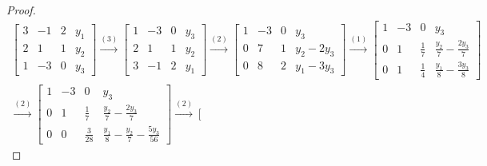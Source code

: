 \begin{proof}
    \begingroup{}
    \allowdisplaybreaks{}
    \begin{align*}
        \left[\begin{array}{ccc|c}
                      3 & -1 & 2 & y_{1} \\
                      2 & 1  & 1 & y_{2} \\
                      1 & -3 & 0 & y_{3}
                  \end{array}\right]
        \stackrel{(3)}{\rightarrow}
        \left[\begin{array}{ccc|c}
                      1 & -3 & 0 & y_{3} \\
                      2 & 1  & 1 & y_{2} \\
                      3 & -1 & 2 & y_{1}
                  \end{array}\right]
        \stackrel{(2)}{\rightarrow}
        \left[\begin{array}{ccc|c}
                      1 & -3 & 0 & y_{3}            \\
                      0 & 7  & 1 & y_{2} - 2{y_{3}} \\
                      0 & 8  & 2 & y_{1} - 3{y_{3}}
                  \end{array}\right]
        \stackrel{(1)}{\rightarrow}
        \left[\begin{array}{ccc|c}
                      1 & -3 & 0           & y_{3}                                \\
                      0 & 1  & \frac{1}{7} & \frac{y_{2}}{7} - \frac{2{y_{3}}}{7} \\
                      0 & 1  & \frac{1}{4} & \frac{y_{1}}{8} - \frac{3{y_{3}}}{8}
                  \end{array}\right]                                                     \\
        \stackrel{(2)}{\rightarrow}
        \left[\begin{array}{ccc|c}
                      1 & -3 & 0            & y_{3}                                                   \\
                      0 & 1  & \frac{1}{7}  & \frac{y_{2}}{7} - \frac{2{y_{3}}}{7}                    \\
                      0 & 0  & \frac{3}{28} & \frac{y_{1}}{8} - \frac{y_{2}}{7} - \frac{5{y_{3}}}{56}\end{array}\right]
        \stackrel{(2)}{\rightarrow}
        \left[\begin{array}{ccc|c}

\end{array}
\end{align*}
\end{proof}

